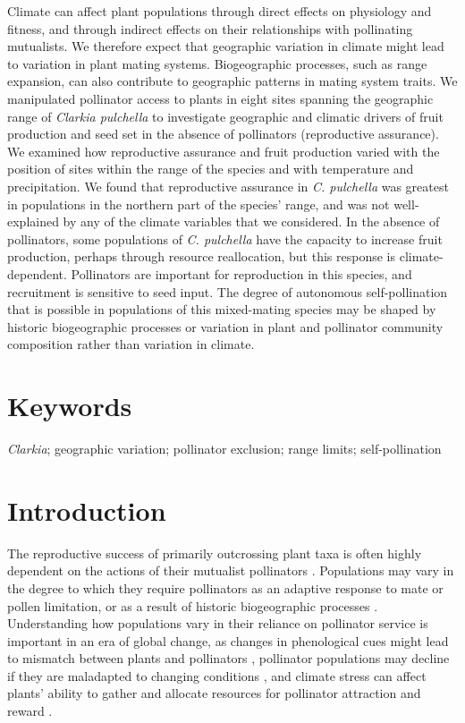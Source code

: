 \documentclass{article}
\begin{document}
Climate can affect plant populations through direct effects on physiology and fitness, and through indirect effects on their relationships with pollinating mutualists. We therefore expect that geographic variation in climate might lead to variation in plant mating systems. Biogeographic processes, such as range expansion, can also contribute to geographic patterns in mating system traits. We manipulated pollinator access to plants in eight sites spanning the geographic range of \textit{Clarkia pulchella} to investigate geographic and climatic drivers of fruit production and seed set in the absence of pollinators (reproductive assurance). We examined how reproductive assurance and fruit production varied with the position of sites within the range of the species and with temperature and precipitation. We found that reproductive assurance in \textit{C. pulchella} was greatest in populations in the northern part of the species' range, and was not well-explained by any of the climate variables that we considered. In the absence of pollinators, some populations of \textit{C. pulchella} have the capacity to increase fruit production, perhaps through resource reallocation, but this response is climate-dependent. Pollinators are important for reproduction in this species, and recruitment is sensitive to seed input. The degree of autonomous self-pollination that is possible in populations of this mixed-mating species may be shaped by historic biogeographic processes or variation in plant and pollinator community composition rather than variation in climate.


\section*{Keywords}
\textit{Clarkia}; geographic variation; pollinator exclusion; range limits; self-pollination

\section*{Introduction}

The reproductive success of primarily outcrossing plant taxa is often highly dependent on the actions of their mutualist pollinators \citep{burd1994principle, ashman2004pollen}. Populations may vary in the degree to which they require pollinators as an adaptive response to mate or pollen limitation, or as a result of historic biogeographic processes \citep{busch2005evolution}. Understanding how populations vary in their reliance on pollinator service is important in an era of global change, as changes in phenological cues might lead to mismatch between plants and pollinators \citep{kudo2013early}, pollinator populations may decline if they are maladapted to changing conditions \citep{williams2007vulnerability}, and climate stress can affect plants' ability to gather and allocate resources for pollinator attraction and reward \citep{mu2015artificial}.  
\end{document}
